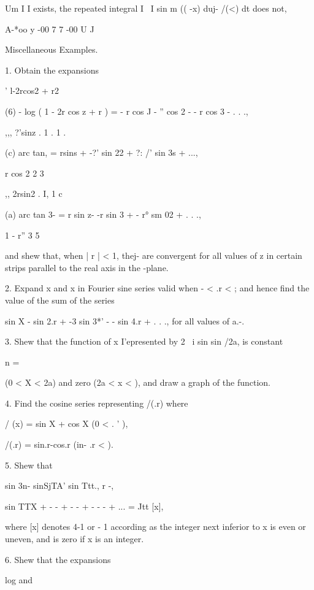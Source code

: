 Um I I exists, the repeated integral I \ I sin m (( -x) duj- /(<) dt
does not,

A-*oo y -00 7 7 -00 U J

%
%

Miscellaneous Examples.

1. Obtain the expansions

  ' l-2rcos2 + r2

(6) - log ( 1 - 2r cos z + r ) = - r cos J - '' cos 2 - - r cos 3 - .
. .,

,,, ?'sinz . 1 . 1 . \,

(c) arc tan, = rsins + -?' sin 22 + ?: /' sin 3s + ...,

   r cos 2 2 3

,, 2rsin2 . I,  1 c

(a) arc tan 3- = r sin z- -r sin 3 + - r° sm 02 + . . .,

1 - r'' 3 5

and shew that, when | r | < 1, thej- are convergent for all values of
z in certain strips parallel to the real axis in the -plane.

2. Expand x and x in Fourier sine series valid when - \pi < .r < \pi;
and hence find the value of the sum of the series

sin X - sin 2.r + -3 sin 3*' - - sin 4.r + . . ., for all values of
a.-. 

3. Shew that the function of x I'epresented by 2 ~i sin sin /2a, is
constant

n = \

(0 < X < 2a) and zero (2a < x < \pi), and draw a graph of the function.


4. Find the cosine series representing /(.r) where

/ (x) = sin X + cos X (0 < . ' \pi ),

/(.r) = sin.r-cos.r (in- .r < \pi). 

5. Shew that

sin 3n- sinSjTA' sin Ttt., r -,

sin TTX + - - + - - + - - - + ... = Jtt [x],

where [x] denotes 4-1 or - 1 according as the integer next inferior to
x is even or uneven, and is zero if x is an integer. 

6. Shew that the expansions

log and

